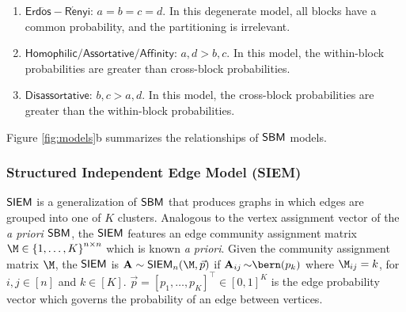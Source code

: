 \begin{enumerate}
    \item $\mathsf{Erd\ddot{o}s-R\acute{e}nyi}$: $a=b=c=d$. In this degenerate model, all blocks have a common probability, and the partitioning is irrelevant. 
    \item $\mathsf{Homophilic/Assortative/Affinity}$: $a, d > b, c$. In this model, the within-block probabilities are greater than cross-block probabilities.
    \item $\mathsf{Disassortative}$: $ b, c > a, d$. In this model, the cross-block probabilities are greater than the within-block probabilities.
\end{enumerate}
Figure \ref{fig:models}b summarizes the relationships of $\operatorname{\mathsf{SBM}}$ models.



\subsubsection{Structured Independent Edge Model (SIEM)}\label{sec:usiem}
$\operatorname{\mathsf{SIEM}}$ is a generalization of $\operatorname{\mathsf{SBM}}$ that produces graphs in which edges are grouped into one of $K$ clusters. Analogous to the vertex assignment vector of the \textit{a priori} $\operatorname{\mathsf{SBM}}$, the $\operatorname{\mathsf{SIEM}}$ features an edge community assignment matrix $\M \in \left\{1, \hdots, K\right\}^{n \times n}$ which is known \textit{a priori}. Given the community assignment matrix $\M$, the $\operatorname{\mathsf{SIEM}}$ is $\A \sim \siem_n(\M, \vec p)$ if $\A_{ij} {\sim}\bern(p_k)$ where $\M_{ij} = k$, for $i, j \in [n]$ and $k \in [K]$. $\vec p = [p_1, \hdots, p_K]^\top \in [0, 1]^K$ is the edge probability vector which governs the probability of an edge between vertices. 


